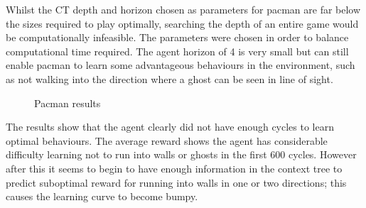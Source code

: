 \documentclass[pdftex,twoside,a4paper]{report}
\begin{document}
Whilst the CT depth and horizon chosen as parameters for pacman are far below the sizes required to play optimally, searching the depth of an entire game would be computationally infeasible. The parameters were chosen in order to balance computational time required. The agent horizon of 4 is very small but can still enable pacman to learn some advantageous behaviours in the environment, such as not walking into the direction where a ghost can be seen in line of sight.
\begin{figure}[h]
  \begin{center}
  \end{center}
  \caption{Pacman results}
  \label{fig:pacman_results}
\end{figure}

The results show that the agent clearly did not have enough cycles to learn optimal behaviours. The average reward shows the agent has considerable difficulty learning not to run into walls or ghosts in the first 600 cycles. However after this it seems to begin to have enough information in the context tree to predict suboptimal reward for running into walls in one or two directions; this causes the learning curve to become bumpy.



\end{document}
